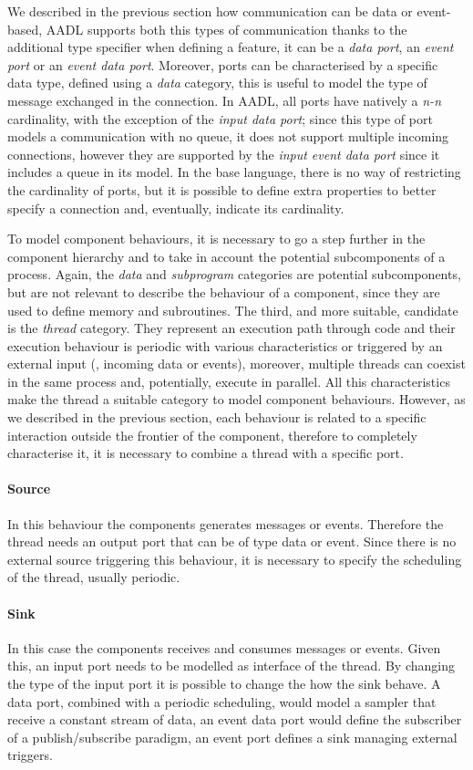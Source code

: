 We described in the previous section how communication can be data or event-based, AADL supports both this types of communication thanks to the additional type specifier when defining a feature, it can be a \textit{data port}, an \textit{event port} or an \textit{event data port}. Moreover, ports can be characterised by a specific data type, defined using a \textit{data} category, this is useful to model the type of message exchanged in the connection. In AADL, all ports have natively a \textit{n-n} cardinality, with the exception of the \textit{input data port}; since this type of port models a communication with no queue, it does not support multiple incoming connections, however they are supported by the \textit{input event data port} since it includes a queue in its model. In the base language, there is no way of restricting the cardinality of ports, but it is possible to define extra properties to better specify a connection and, eventually, indicate its cardinality.

To model component behaviours, it is necessary to go a step further in the component hierarchy and to take in account the potential subcomponents of a process. Again, the \textit{data} and \textit{subprogram} categories are potential subcomponents, but are not relevant to describe the behaviour of a component, since they are used to define memory and subroutines. The third, and more suitable, candidate is the \textit{thread} category. They represent an execution path through code and their execution behaviour is periodic with various characteristics or triggered by an external input (\eg, incoming data or events), moreover, multiple threads can coexist in the same process and, potentially, execute in parallel. All this characteristics make the thread a suitable category to model component behaviours. However, as we described in the previous section, each behaviour is related to a specific interaction outside the frontier of the component, therefore to completely characterise it, it is necessary to combine a thread with a specific port.
\paragraph{Source} In this behaviour the components generates messages or events. Therefore the thread needs an output port that can be of type data or event. Since there is no external source triggering this behaviour, it is necessary to specify the scheduling of the thread, usually periodic.
\paragraph{Sink} In this case the components receives and consumes messages or events. Given this, an input port needs to be modelled as interface of the thread. By changing the type of the input port it is possible to change the how the sink behave. A data port, combined with a periodic scheduling, would model a sampler that receive a constant stream of data, an event data port would define the subscriber of a publish/subscribe paradigm, an event port defines a sink managing external triggers.
